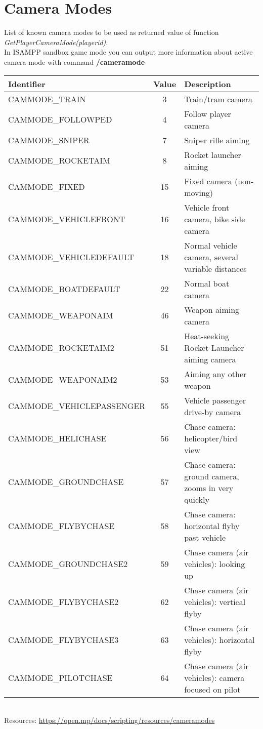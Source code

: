 \documentclass{article}
\begin{document}
\newpage
\section{Camera Modes}
\begin{sloppypar}
List of known camera modes to be used as returned value of function \textit{GetPlayerCameraMode(playerid)}.\\In ISAMPP sandbox game mode you can output more information about active camera mode with command \textbf{/cameramode}
\end{sloppypar}
\bigskip
\noindent\begin{tabular}{ |l|c|l| } 
\hline
Identifier & Value & Description \\
\hline
CAMMODE\_TRAIN & 3 & Train/tram camera \\
CAMMODE\_FOLLOWPED & 4 & Follow player camera \\
CAMMODE\_SNIPER & 7 & Sniper rifle aiming \\
CAMMODE\_ROCKETAIM & 8 & Rocket launcher aiming \\
CAMMODE\_FIXED & 15 & Fixed camera (non-moving) \\
CAMMODE\_VEHICLEFRONT & 16 & Vehicle front camera, bike side camera \\
CAMMODE\_VEHICLEDEFAULT & 18 & Normal vehicle camera, several variable distances \\
CAMMODE\_BOATDEFAULT & 22 & Normal boat camera \\
CAMMODE\_WEAPONAIM & 46 & Weapon aiming camera \\
CAMMODE\_ROCKETAIM2 & 51 & Heat-seeking Rocket Launcher aiming camera \\
CAMMODE\_WEAPONAIM2 & 53 & Aiming any other weapon \\
CAMMODE\_VEHICLEPASSENGER & 55 & Vehicle passenger drive-by camera \\
CAMMODE\_HELICHASE & 56 & Chase camera: helicopter/bird view \\
CAMMODE\_GROUNDCHASE & 57 & Chase camera: ground camera, zooms in very quickly \\
CAMMODE\_FLYBYCHASE & 58 & Chase camera: horizontal flyby past vehicle \\
CAMMODE\_GROUNDCHASE2 & 59 & Chase camera (air vehicles): looking up \\
CAMMODE\_FLYBYCHASE2 & 62 & Chase camera (air vehicles): vertical flyby \\
CAMMODE\_FLYBYCHASE3 & 63 & Chase camera (air vehicles): horizontal flyby \\
CAMMODE\_PILOTCHASE & 64 & Chase camera (air vehicles): camera focused on pilot \\
\hline
\end{tabular}
\bigskip
\\Resources: \url{https://open.mp/docs/scripting/resources/cameramodes}
\end{document}
